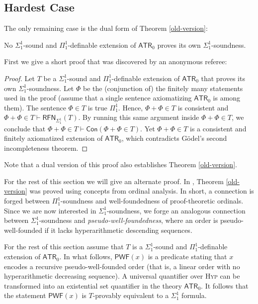 \documentclass{amsart}
\theoremstyle{definition}
\theoremstyle{remark}
\begin{document}
\subsection{Hardest Case}

The only remaining case is the dual form of Theorem \ref{old-version}:
\begin{theorem}\label{main}
No $\Sigma^1_1$-sound and $\Pi^1_1$-definable extension of $\mathsf{ATR}_0$ proves its own $\Sigma^1_1$-soundness.
\end{theorem}

First we give a short proof that was discovered by an anonymous referee:
\begin{proof}
    Let $T$ be a $\Sigma^1_1$-sound and $\Pi^1_1$-definable extension of $\mathsf{ATR}_0$ that proves its own $\Sigma^1_1$-soundness. Let $\Phi$ be the (conjunction of) the finitely many statements used in the proof (assume that a single sentence axiomatizing $\mathsf{ATR}_0$ is among them). The sentence $\Phi\in T$ is true $\Pi^1_1$. Hence, $\Phi+\Phi\in T$ is consistent and $\Phi+\Phi\in T\vdash \mathsf{RFN}_{\Sigma^1_1}(T)$. By running this same argument inside $\Phi+\Phi\in T$, we conclude that $\Phi+\Phi\in T\vdash \mathsf{Con}(\Phi+\Phi\in T)$. Yet $\Phi + \Phi\in T$ is a consistent and finitely axiomatized extension of $\mathsf{ATR}_0$, which contradicts G\"odel's second incompleteness theorem.
\end{proof}
Note that a dual version of this proof also establishes Theorem \ref{old-version}.


For the rest of this section we will give an alternate proof. In \cite{walsh2021incompleteness}, Theorem \ref{old-version} was proved using concepts from ordinal analysis. In short, a connection is forged between $\Pi^1_1$-soundness and well-foundedness of proof-theoretic ordinals. Since we are now interested in $\Sigma^1_1$-soundness, we forge an analogous connection between $\Sigma^1_1$-soundness and \emph{pseudo-well-foundedness}, where an order is pseudo-well-founded if it lacks hyperarithmetic descending sequences.

For the rest of this section assume that $T$ is a $\Sigma^1_1$-sound and $\Pi^1_1$-definable extension of $\mathsf{ATR}_0$. In what follows, $\mathsf{PWF}(x)$ is a predicate stating that $x$ encodes a recursive pseudo-well-founded order (that is, a linear order with no hyperarithmetic decreasing sequence). A universal quantifier over \textsc{Hyp} can be transformed into an existential set quantifier in the theory $\mathsf{ATR}_0$. It follows that the statement $\mathsf{PWF}(x)$ is $T$-provably equivalent to a $\Sigma^1_1$ formula.
\end{document}
